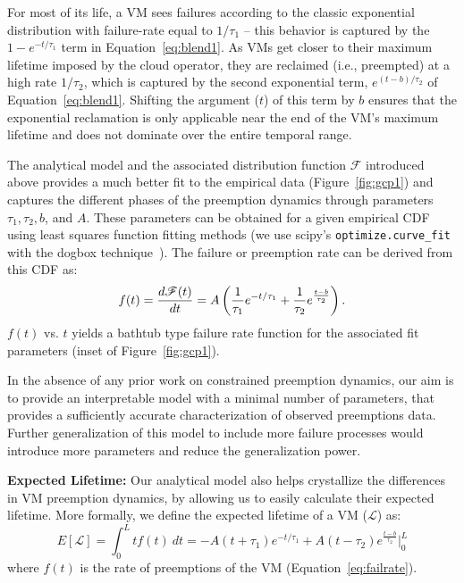 \documentclass[sigconf]{acmart} %
\newcommand{\eqnspace}[0]{-0.1cm}
\begin{document}
For most of its life, a VM sees failures according to the classic exponential distribution with failure-rate equal to $1/\tau_1$ -- this behavior is captured by the $1-e^{-t/\tau_1}$ term in Equation~\ref{eq:blend1}. 
As VMs get closer to their maximum lifetime imposed by the cloud operator, they are reclaimed (i.e., preempted) at a high rate $1/\tau_2$, which is captured by the second exponential term, $e^{(t-b)/\tau_2}$ of Equation~\ref{eq:blend1}. 
Shifting the argument ($t$) of this term by $b$ ensures that the exponential reclamation is only applicable near the end of the VM's maximum lifetime and does not dominate over the entire temporal range. 

The analytical model and the associated  distribution function $\mathscr{F}$ introduced above provides a much better fit to the empirical data (Figure~\ref{fig:gcp1}) and captures the different phases of the preemption dynamics through parameters $\tau_1, \tau_2, b$, and $A$. These parameters can be obtained for a given empirical CDF using least squares function fitting methods (we use scipy's \texttt{optimize.curve\_fit} with the dogbox technique~\cite{scipy-fit}). The failure or preemption rate can be derived from this CDF as:
\begin{equation}
  \label{eq:failrate}
    \vspace*{\eqnspace}
f(t) = \dfrac{d \mathscr{F}(t)} {dt} = A \left(\dfrac{1}{\tau_1}e^{-t/\tau_1} + \dfrac{1}{\tau_2}e^{\frac{t-b}{\tau_2}}\right).
\end{equation}
$f(t)$ vs. $t$ yields a bathtub type failure rate function for the associated fit parameters (inset of Figure~\ref{fig:gcp1}).

In the absence of any prior work on constrained preemption dynamics, our aim is to provide an interpretable model with a minimal number of parameters, that provides a sufficiently accurate characterization of observed preemptions data. 
Further generalization of this model to include more failure processes would introduce more parameters and reduce the generalization power. 

\noindent \textbf{Expected Lifetime:} Our analytical model also helps crystallize the differences in VM preemption dynamics, by allowing us to easily calculate their expected lifetime. 
More formally, we define the expected lifetime of a VM ($\mathscr{L}$) as: 
\begin{equation}
  \label{eq:expected-lifetime}
E[\mathscr{L}] =  \int_{0}^{L} t {f}(t)~dt =  -A(t+\tau_1)e^{-t/\tau_1} + A(t-\tau_2) e^{\frac{t-b}{\tau_2}} \biggr\rvert_{0}^{L}
\end{equation}
where $f(t)$ is the rate of preemptions of the VM (Equation~\ref{eq:failrate}).
\end{document}
